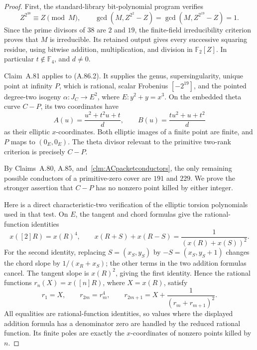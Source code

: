 \documentclass[11pt]{article}
\begin{document}
\begin{proof}
First, the standard-library bit-polynomial program
 verifies
\[
 Z^{2^{38}}\equiv Z\pmod M,
 \qquad
 \gcd(M,Z^{2^2}-Z)=\gcd(M,Z^{2^{19}}-Z)=1.
                                                               \tag{A.86.3}
\]
Since the prime divisors of \(38\) are \(2\) and \(19\),
the finite-field irreducibility criterion proves that \(M\) is
irreducible. Its retained output gives every successive squaring
residue, using bitwise addition, multiplication, and division in
\(\mathbb F_2[Z]\). In particular \(t\notin\mathbb F_4\),
and \(d\ne0\).

Claim~A.81 applies to (A.86.2). It supplies the genus,
supersingularity, unique point at infinity \(P\), which is rational,
scalar Frobenius
\([-2^{19}]\), and the pointed degree-two isogeny
\(\alpha:J_C\to E^2\), where \(E:y^2+y=x^3\). On the
embedded theta curve \(C-P\), its two coordinates have
\[
 A(u)=\frac{u^2+t^2u+t}{d},\qquad
 B(u)=\frac{tu^2+u+t^2}{d}                              \tag{A.86.4}
\]
as their elliptic \(x\)-coordinates. Both elliptic images of a
finite point are finite, and \(P\) maps to \((0_E,0_E)\).
The theta divisor relevant to the primitive two-rank criterion
is precisely \(C-P\).

By Claims~A.80, A.85, and~\ref{clm:ACpacketconductors}, the
only remaining possible conductors of a primitive-zero cover are
\(191\) and \(229\). We prove the stronger assertion that
\(C-P\) has no nonzero point killed by either integer.

Here is a direct characteristic-two verification of the elliptic
torsion polynomials used in that test. On \(E\), the tangent
and chord formulas give the rational-function identities
\[
 x([2]R)=x(R)^4,
 \qquad
 x(R+S)+x(R-S)=\frac{1}{(x(R)+x(S))^2}.
                                                               \tag{A.86.5}
\]
For the second identity, replacing \(S=(x_S,y_S)\) by
\(-S=(x_S,y_S+1)\) changes the chord slope by
\(1/(x_R+x_S)\); the other terms in the two addition formulas
cancel. The tangent slope is \(x(R)^2\), giving the first
identity. Hence the rational functions \(r_n(X)=x([n]R)\),
where \(X=x(R)\), satisfy
\[
 r_1=X,\qquad r_{2m}=r_m^4,\qquad
 r_{2m+1}=X+\frac{1}{(r_m+r_{m+1})^2}.             \tag{A.86.6}
\]
All equalities are rational-function identities, so values where
the displayed addition formula has a denominator zero are
handled by the reduced rational function. Its finite poles are
exactly the \(x\)-coordinates of nonzero points killed by \(n\).


\end{proof}
\end{document}
